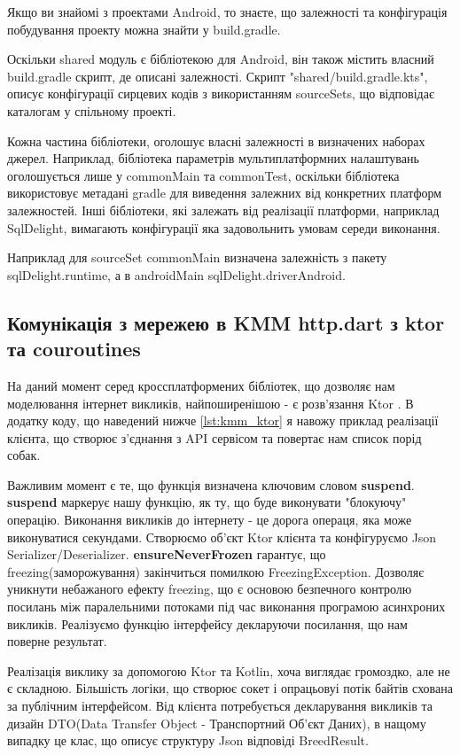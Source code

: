Якщо ви знайомі з проектами Android, то знаєте, що залежності та конфігурація побудування проекту можна знайти у build.gradle.

Оскільки shared модуль є бібліотекою для Android, він також містить власний build.gradle скрипт, де описані залежності.
Скрипт "shared/build.gradle.kts", описує конфігурації сирцевих кодів з використанням sourceSets, що відповідає каталогам у спільному проекті.

Кожна частина бібліотеки, оголошує власні залежності в визначених наборах джерел.
Наприклад, бібліотека параметрів мультиплатформних налаштувань оголошується лише у commonMain та commonTest,
оскільки бібліотека використовує метадані gradle для виведення залежних від конкретних платформ залежностей.
Інші бібліотеки, які залежать від реалізації платформи, наприклад SqlDelight, вимагають конфігурації яка задовольнить
умовам середи виконання.

Наприклад для sourceSet commonMain визначена залежність з пакету sqlDelight.runtime, а в androidMain sqlDelight.driverAndroid.

\subsection{Комунікація з мережею в KMM http.dart з ktor та couroutines}
\label{subsec:kmm_ktor}
На даний момент серед кроссплатформених бібліотек, що дозволяє нам моделювання інтернет викликів,
найпоширенішою - є розв'язання Ktor \cite{ktor_home_page}.
В додатку коду, що наведений нижче \ref{lst:kmm_ktor} я навожу приклад реалізації клієнта,
що створює з'єднання з API сервісом та повертає нам список порід собак.

Важливим момент є те, що функція визначена ключовим словом \textbf{suspend}.
\textbf{suspend} маркерує нашу функцію, як ту, що буде виконувати "блокуючу" операцію.
Виконання викликів до інтернету - це дорога операця, яка може виконуватися секундами.
Створюємо об'єкт Ktor клієнта та конфігуруємо Json Serializer/Deserializer.
\textbf{ensureNeverFrozen} гарантує, що freezing(заморожування) закінчиться помилкою FreezingException.
Дозволяє уникнути небажаного ефекту freezing, що є основою безпечного контролю посилань між паралельними потоками
під час виконання програмою асинхроних викликів.
Реалізуємо функцію інтерфейсу декларуючи посилання, що нам поверне результат.

Реалізація виклику за допомогою Ktor та Kotlin, хоча виглядає громоздко, але не є складною.
Більшість логіки, що створює сокет і опрацьовуі потік байтів схована за публічним інтерфейсом.
Від клієнта потребується декларування викликів та дизайн DTO(Data Transfer Object - Транспортний Об'єкт Даних),
в нащому випадку це клас, що описує структуру Json відповіді BreedResult.

